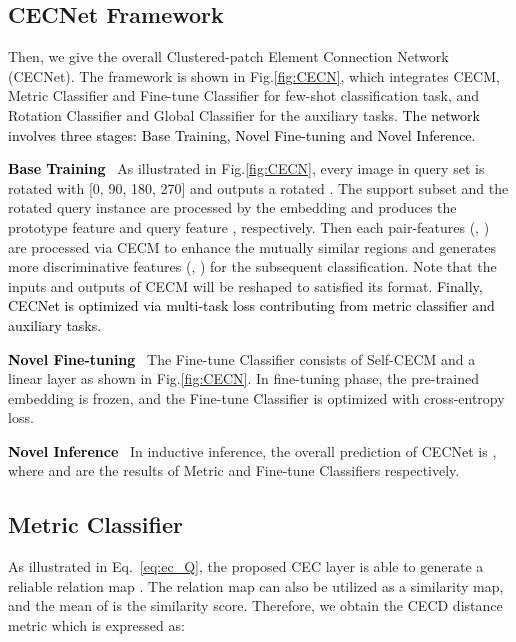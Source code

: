 \documentclass{article}
\newcommand{\ljx}[1]{\textcolor{black}{#1}}
\newcommand{\seasons}[1]{\textcolor{black}{#1}}
\newcommand{\jinxiang}[1]{\textcolor{black}{#1}}
\begin{document}
\subsection{CECNet Framework}
Then, we give the overall Clustered-patch Element Connection Network (CECNet). The framework is shown in Fig.\ref{fig:CECN}, which integrates CECM, Metric Classifier and Fine-tune Classifier for few-shot classification task, and Rotation Classifier and Global Classifier for the auxiliary tasks.
\seasons{The network involves three stages: Base Training, Novel Fine-tuning and Novel Inference.}

\noindent\ljx{\textbf{Base Training}} \
As illustrated in Fig.\ref{fig:CECN}, every image  in query set  is rotated with [0\degree, 90\degree, 180\degree, 270\degree] and outputs a rotated .
The support subset  and the rotated query instance  are processed by the embedding  and produces the prototype feature  and query feature , respectively. Then each pair-features (, ) are processed via CECM to enhance the mutually similar regions and generates more discriminative features (, ) for the subsequent classification. Note that the inputs and outputs of CECM will be reshaped to satisfied its format.
\jinxiang{Finally, CECNet is optimized via multi-task loss contributing from metric classifier and auxiliary tasks.}


\noindent\ljx{\textbf{Novel Fine-tuning}} \
The Fine-tune Classifier consists of Self-CECM and a linear layer as shown in Fig.\ref{fig:CECN}.
In fine-tuning phase, the pre-trained embedding  is frozen, and the Fine-tune Classifier is optimized with cross-entropy loss.

\noindent\ljx{\textbf{Novel Inference}} \
In inductive inference, the overall prediction of CECNet is , where  and  are the results of Metric and Fine-tune Classifiers respectively.



\subsection{Metric Classifier}
As illustrated in Eq.~\ref{eq:ec_Q}, the proposed CEC layer is able to generate a reliable relation map . The relation map  can also be utilized as a similarity map, and the mean of  is the similarity score.
Therefore, we obtain the CECD distance metric  which is expressed as:
\begin{small}

\end{small}
\end{document}
